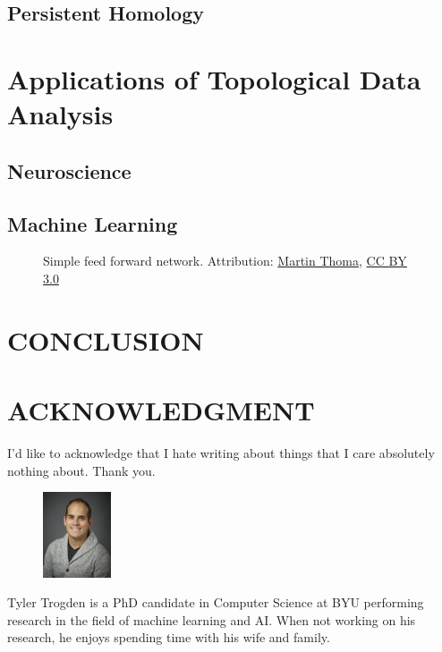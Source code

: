 \documentclass{IEEEcsmag}
\begin{document}
  \subsection{Persistent Homology}

\section{Applications of Topological Data Analysis}
  \subsection{Neuroscience}

  \subsection{Machine Learning}

    \begin{figure}
        \centering
        
        \caption{Simple feed forward network. Attribution: 
                \href{https://commons.wikimedia.org/wiki/User:MartinThoma}{Martin Thoma}, 
                \href{https://creativecommons.org/licenses/by/3.0}{CC BY 3.0}}
    \end{figure}

\section{CONCLUSION}


\newpage
\section{ACKNOWLEDGMENT}
I'd like to acknowledge that I hate writing about things that I care absolutely nothing
about. Thank you.




\begin{figure}
  \centering
  \vspace{-5mm}
  \includegraphics[width=0.18\textwidth]{portrait.jpg}
\end{figure}

\begin{IEEEbiography}{Tyler Trogden} 
  is a PhD candidate in Computer Science at BYU performing research in the
  field of machine learning and AI. When not working on his research, he enjoys
  spending time with his wife and family.
\end{IEEEbiography}
\end{document}
